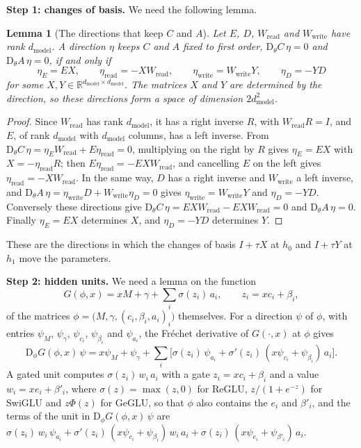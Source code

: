 \documentclass[10pt]{article}
\newtheorem{lemma}[theorem]{Lemma}
\theoremstyle{definition}
\theoremstyle{remark}
\newcommand{\R}{\mathbb{R}}
\newcommand{\Wread}{W_{\mathrm{read}}}
\newcommand{\Wwrite}{W_{\mathrm{write}}}
\newcommand{\dm}{d_{\mathrm{model}}}
\newcommand{\Der}{\mathrm{D}}
\newcommand{\para}[1]{\smallskip\noindent\textbf{#1}\hspace{0.5em}}
\newenvironment{nested}{\par\nopagebreak\def\FrameCommand{\hspace{0.5em}{\color{black!30}\vrule width 0.6pt}\hspace{1em}}\MakeFramed{\advance\hsize-\width\FrameRestore}}{\endMakeFramed}
\begin{document}
\para{Step 1: changes of basis.} We need the following lemma.
\begin{nested}
\begin{lemma}[The directions that keep $C$ and $A$]\label{lem:fact}
Let $E$, $D$, $\Wread$ and $\Wwrite$ have rank $\dm$. A direction $\eta$ keeps $C$ and $A$ fixed to first order, $\Der_\theta C\,\eta = 0$ and $\Der_\theta A\,\eta = 0$, if and only if
\[
\eta_E = EX,\qquad \eta_{\mathrm{read}} = -X\Wread,\qquad \eta_{\mathrm{write}} = \Wwrite Y,\qquad \eta_D = -YD
\]
for some $X, Y \in \R^{\dm\times\dm}$. The matrices $X$ and $Y$ are determined by the direction, so these directions form a space of dimension $2\dm^2$.
\end{lemma}

\begin{proof}
Since $\Wread$ has rank $\dm$, it has a right inverse $R$, with $\Wread R = I$, and $E$, of rank $\dm$ with $\dm$ columns, has a left inverse. From $\Der_\theta C\,\eta = \eta_E\Wread + E\eta_{\mathrm{read}} = 0$, multiplying on the right by $R$ gives $\eta_E = EX$ with $X = -\eta_{\mathrm{read}}R$; then $E\eta_{\mathrm{read}} = -EX\Wread$, and cancelling $E$ on the left gives $\eta_{\mathrm{read}} = -X\Wread$. In the same way, $D$ has a right inverse and $\Wwrite$ a left inverse, and $\Der_\theta A\,\eta = \eta_{\mathrm{write}}D + \Wwrite\eta_D = 0$ gives $\eta_{\mathrm{write}} = \Wwrite Y$ and $\eta_D = -YD$. Conversely these directions give $\Der_\theta C\,\eta = EX\Wread - EX\Wread = 0$ and $\Der_\theta A\,\eta = 0$. Finally $\eta_E = EX$ determines $X$, and $\eta_D = -YD$ determines $Y$.
\end{proof}
\end{nested}

These are the directions in which the changes of basis $I + \tau X$ at $h_0$ and $I + \tau Y$ at $h_1$ move the parameters.

\para{Step 2: hidden units.} We need a lemma on the function
\[
G(\phi, x) = xM + \gamma + \textstyle\sum_i \sigma(z_i)\,a_i,\qquad z_i = xc_i + \beta_i,
\]
of the matrices $\phi = \big(M, \gamma, (c_i, \beta_i, a_i)_i\big)$ themselves. For a direction $\psi$ of $\phi$, with entries $\psi_M$, $\psi_\gamma$, $\psi_{c_i}$, $\psi_{\beta_i}$ and $\psi_{a_i}$, the Fr\'echet derivative of $G(\cdot, x)$ at $\phi$ gives
\begin{equation}\label{eq:dotF}
\Der_\phi G(\phi, x)\,\psi = x\psi_M + \psi_\gamma + \sum_i \big[\sigma(z_i)\,\psi_{a_i} + \sigma'(z_i)\,(x\psi_{c_i} + \psi_{\beta_i})\,a_i\big].
\end{equation}
A gated unit computes $\sigma(z_i)\,w_i\,a_i$ with a gate $z_i = xc_i + \beta_i$ and a value $w_i = xe_i + \beta'_i$, where $\sigma(z) = \max(z, 0)$ for ReGLU, $z/(1 + e^{-z})$ for SwiGLU and $z\Phi(z)$ for GeGLU, so that $\phi$ also contains the $e_i$ and $\beta'_i$, and the terms of the unit in $\Der_\phi G(\phi, x)\,\psi$ are $\sigma(z_i)\,w_i\,\psi_{a_i} + \sigma'(z_i)\,(x\psi_{c_i} + \psi_{\beta_i})\,w_i\,a_i + \sigma(z_i)\,(x\psi_{e_i} + \psi_{\beta'_i})\,a_i$.
\end{document}
